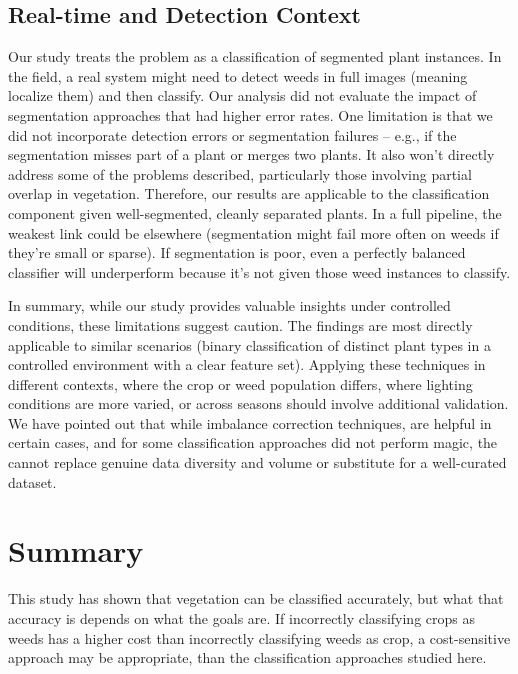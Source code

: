 \documentclass[letterpaper]{report}
\begin{document}
\subsection{Real-time and Detection Context}
Our study treats the problem as a classification of segmented plant instances. In the field, a real system might need to detect weeds in full images (meaning localize them) and then classify. Our analysis did not evaluate the impact of segmentation approaches that had higher error rates. One limitation is that we did not incorporate detection errors or segmentation failures – e.g., if the segmentation misses part of a plant or merges two plants.  It also won’t directly address some of the problems described, particularly those involving partial overlap in vegetation.  Therefore, our results are applicable to the classification component given well-segmented, cleanly separated plants. In a full pipeline, the weakest link could be elsewhere (segmentation might fail more often on weeds if they’re small or sparse). If segmentation is poor, even a perfectly balanced classifier will underperform because it’s not given those weed instances to classify. 

In summary, while our study provides valuable insights under controlled conditions, these limitations suggest caution. The findings are most directly applicable to similar scenarios (binary classification of distinct plant types in a controlled environment with a clear feature set). Applying these techniques in different contexts, where the crop or weed population differs, where lighting conditions are more varied, or across seasons should involve additional validation. We have pointed out that while  imbalance correction techniques, are helpful in certain cases, and for some classification approaches  did not perform magic, the cannot replace genuine data diversity and volume or substitute for a well-curated dataset.

\section{Summary}
This study has shown that vegetation can be classified accurately, but what that accuracy is depends on what the goals are. If incorrectly classifying crops as weeds has a higher cost than incorrectly classifying weeds as crop, a cost-sensitive approach may be appropriate, than the classification approaches studied here. 
\end{document}
